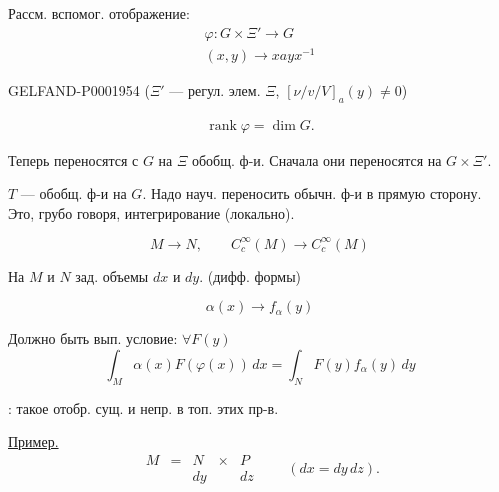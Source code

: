 Рассм. вспомог. отображение:
\begin{gather*}
\varphi:G\times\Xi'\longrightarrow G\\
(x,y)\longrightarrow xayx^{-1}
\end{gather*}



\begin{GelfandAdjacentEvidence}{GELFAND-P000195}{4}
($\Xi'$ — регул. элем. $\Xi$,
$[\nu/v/V]_a(y)\ne0$)
\end{GelfandAdjacentEvidence}

\begin{gather*}
\operatorname{rank}\varphi=\dim G.
\end{gather*}



Теперь переносятся с $G$ на $\Xi$ обобщ. ф-и.
Сначала они переносятся на $G\times\Xi'$.



$T$ — обобщ. ф-и на $G$.
Надо науч. переносить обычн. ф-и в прямую
сторону. Это, грубо говоря, интегрирование (локально).





\begin{equation*}
M\longrightarrow N,\qquad C_c^{\infty}(M)\longrightarrow C_c^{\infty}(M)
\end{equation*}



На $M$ и $N$ зад. объемы $dx$ и $dy$. (дифф. формы)



\begin{equation*}\alpha(x)\longrightarrow f_{\alpha}(y)\end{equation*}



Должно быть вып. условие: $\forall F(y)$
\begin{equation*}
\int_M\alpha(x)F(\varphi(x))\,dx
=\int_N F(y)f_{\alpha}(y)\,dy
\end{equation*}



: такое отобр. сущ. и непр. в топ. этих пр-в.



\underline{Пример.}
\begin{equation*}
\begin{array}{ccccc}M&=&N&\times&P\\&&dy&&dz\end{array}
\qquad (dx=dy\,dz).
\end{equation*}



